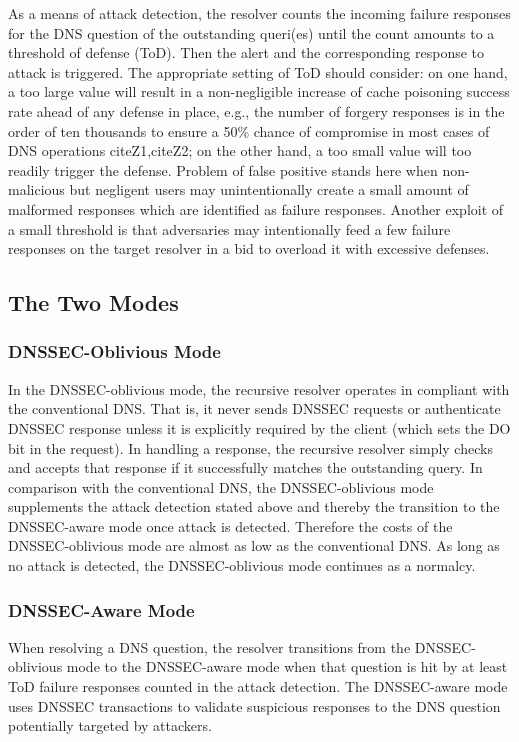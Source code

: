 \documentclass[conference]{IEEEtran}
\begin{document}
As a means of attack detection, the resolver counts the incoming failure responses for the DNS question of the outstanding queri(es) until the count amounts to a threshold of defense (ToD). Then the alert and the corresponding response to attack is triggered. The appropriate setting of ToD should consider: on one hand, a too large value will result in a non-negligible increase of cache poisoning success rate ahead of any defense in place, e.g., the number of forgery responses is in the order of ten thousands to ensure a 50\% chance of compromise in most cases of DNS operations cite{Z1},cite{Z2}; on the other hand, a too small value will too readily trigger the defense. Problem of false positive stands here when non-malicious but negligent users may unintentionally create a small amount of malformed responses which are identified as failure responses. Another exploit of a small threshold is that adversaries may intentionally feed a few failure responses on the target resolver in a bid to overload it with excessive defenses.

\subsection{The Two Modes}

\subsubsection{DNSSEC-Oblivious Mode}

In the DNSSEC-oblivious mode, the recursive resolver operates in compliant with the conventional DNS. That is, it never sends DNSSEC requests or authenticate DNSSEC response unless it is explicitly required by the client (which sets the DO bit in the request). In handling a response, the recursive resolver simply checks and accepts that response if it successfully matches the outstanding query. In comparison with the conventional DNS, the DNSSEC-oblivious mode supplements the attack detection stated above and thereby the transition to the DNSSEC-aware mode once attack is detected. Therefore the costs of the DNSSEC-oblivious mode are almost as low as the conventional DNS. As long as no attack is detected, the DNSSEC-oblivious mode continues as a normalcy.

\subsubsection{DNSSEC-Aware Mode}

When resolving a DNS question, the resolver transitions from the DNSSEC-oblivious mode to the DNSSEC-aware mode when that question is hit by at least ToD failure responses counted in the attack detection. The DNSSEC-aware mode uses DNSSEC transactions to validate suspicious responses to the DNS question potentially targeted by attackers.
\end{document}
